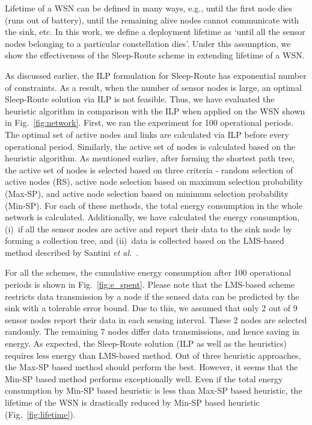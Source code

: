 \documentclass[conference]{IEEEtran}
\begin{document}
Lifetime of a WSN can be defined in many ways, e.g., until the first node dies (runs out of battery), until the remaining alive nodes cannot communicate with the sink, etc. In this work, we define a deployment lifetime as `until all the sensor nodes belonging to a particular constellation dies'. Under this assumption, we show the effectiveness of the Sleep-Route scheme in extending lifetime of a WSN.

As discussed earlier, the ILP formulation for Sleep-Route has exponential number of constraints. As a result, when the number of sensor nodes is large, an optimal Sleep-Route solution via ILP is not feasible. Thus, we have evaluated the heuristic algorithm in comparison with the ILP when applied on the WSN shown in Fig.~\ref{fig:network}. First, we ran the experiment for 100 operational periods. The optimal set of active nodes and links are calculated via ILP before every operational period. Similarly, the active set of nodes is calculated based on the heuristic algorithm. As mentioned earlier, after forming the shortest path tree, the active set of nodes is selected based on three criteria - random selection of active nodes (RS), active node selection based on maximum selection probability (Max-SP), and active node selection based on minimum selection probability (Min-SP).  For each of these methods, the total energy consumption in the whole network is calculated. Additionally, we have calculated the energy consumption, (i)~if all the sensor nodes are active and report their data to the sink node by forming a collection tree, and (ii)~data is collected based on the LMS-based method described by Santini {\it et al.}~\cite{santini2006adaptive}. 
 
For all the schemes, the cumulative energy consumption after 100 operational periods is shown in Fig.~\ref{fig:e_spent}. Please note that the LMS-based scheme restricts data transmission by a node if the sensed data can be predicted by the sink with a tolerable error bound. Due to this, we assumed that only 2 out of 9 sensor nodes report their data in each sensing interval.  These 2 nodes are selected randomly. The remaining 7 nodes differ data transmissions, and hence saving in energy. As expected, the Sleep-Route solution (ILP as well as the heuristics) requires less energy than LMS-based method. Out of three heuristic approaches, the Max-SP based method should perform the best. However, it seems that the Min-SP based method performs exceptionally well. Even if the total energy consumption by Min-SP based heuristic is less than Max-SP based heuristic, the lifetime of the WSN is drastically reduced by Min-SP based heuristic (Fig.~\ref{fig:lifetime}).
\end{document}
